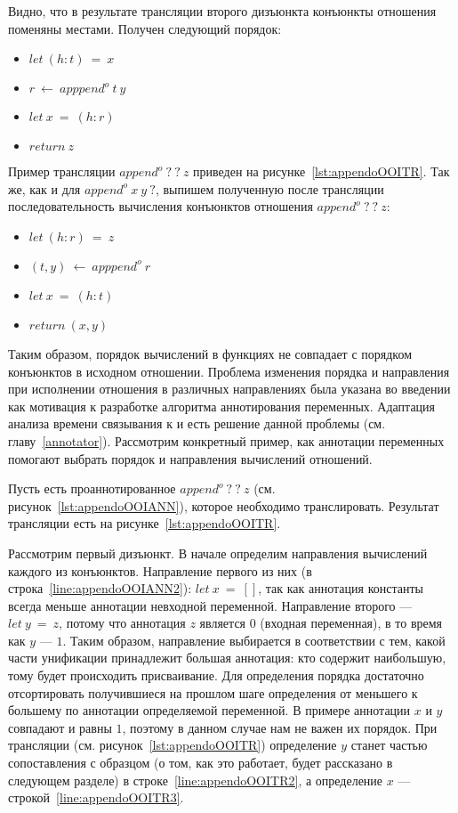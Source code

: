 Видно, что в результате трансляции второго дизъюнкта конъюнкты отношения поменяны местами.
Получен следующий порядок:
\begin{itemize}
    \item $let~(h:t)~=~x$
    \item $r~\gets~apppend^o~t~y$
    \item $let~x~=~(h:r)$
    \item $return~z$
\end{itemize}

Пример трансляции $append^o \ ? \ ? \ z$ приведен на рисунке~\ref{lst:appendoOOITR}.
Так же, как и для $append^o \ x \ y \ ?$, выпишем полученную после трансляции последовательность вычисления конъюнктов отношения $append^o \ ? \ ? \ z$:
\begin{itemize}
    \item $let~(h:r)~=~z$
    \item $(t,y)~\gets~apppend^o~r$
    \item $let~x~=~(h:t)$
    \item $return~(x,y)$
\end{itemize}

Таким образом, порядок вычислений в функциях не совпадает с порядком конъюнктов в исходном отношении.
Проблема изменения порядка и направления при исполнении отношения в различных направлениях была указана во введении как мотивация к разработке алгоритма аннотирования переменных.
Адаптация анализа времени связывания к \miniKanren{} и есть решение данной проблемы (см. главу~\ref{annotator}).
Рассмотрим конкретный пример, как аннотации переменных помогают выбрать порядок и направления вычислений отношений.

Пусть есть проаннотированное $append^o \ ? \ ? \ z$ (см. рисунок~\ref{lst:appendoOOIANN}), которое необходимо транслировать.
Результат трансляции есть на рисунке~\ref{lst:appendoOOITR}.

Рассмотрим первый дизъюнкт.
В начале определим направления вычислений каждого из конъюнктов.
Направление первого из них (в строка~\ref{line:appendoOOIANN2}): $let~x~=~[]$, так как аннотация константы всегда меньше аннотации невходной переменной.
Направление второго --- $let~y~=~z$, потому что аннотация $z$ является $0$ (входная переменная), в то время как $y$ --- $1$.
Таким образом, направление выбирается в соответствии с тем, какой части унификации принадлежит большая аннотация: кто содержит наибольшую, тому будет происходить присваивание.
Для определения порядка достаточно отсортировать получившиеся на прошлом шаге определения от меньшего к большему по аннотации определяемой переменной.
В примере аннотации $x$ и $y$ совпадают и равны $1$, поэтому в данном случае нам не важен их порядок.
При трансляции (см. рисунок~\ref{lst:appendoOOITR}) определение $y$ станет частью сопоставления с образцом (о том, как это работает, будет рассказано в следующем разделе) в строке~\ref{line:appendoOOITR2}, а определение $x$ --- строкой~\ref{line:appendoOOITR3}.

